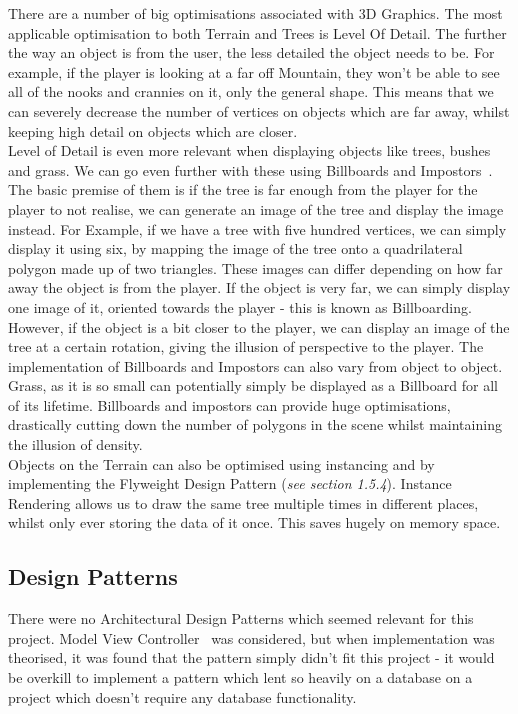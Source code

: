 \documentclass[a4paper,10pt]{report}
\begin{document}
There are a number of big optimisations associated with 3D Graphics. The most applicable optimisation to both Terrain and Trees is Level Of Detail. The further the way an object is from the user, the less detailed the object needs to be. For example, if the player is looking at a far off Mountain, they won't be able to see all of the nooks and crannies on it, only the general shape. This means that we can severely decrease the number of vertices on objects which are far away, whilst keeping high detail on objects which are closer. \\

Level of Detail is even more relevant when displaying objects like trees, bushes and grass. We can go even further with these using Billboards and Impostors~\cite{jia2013fast}. The basic premise of them is if the tree is far enough from the player for the player to not realise, we can generate an image of the tree and display the image instead. For Example, if we have a tree with five hundred vertices, we can simply display it using six, by mapping the image of the tree onto a quadrilateral polygon made up of two triangles. These images can differ depending on how far away the object is from the player. If the object is very far, we can simply display one image of it, oriented towards the player - this is known as Billboarding. However, if the object is a bit closer to the player, we can display an image of the tree at a certain rotation, giving the illusion of perspective to the player. The implementation of Billboards and Impostors can also vary from object to object. Grass, as it is so small can potentially simply be displayed as a Billboard for all of its lifetime. Billboards and impostors can provide huge optimisations, drastically cutting down the number of polygons in the scene whilst maintaining the illusion of density. \\

Objects on the Terrain can also be optimised using instancing and by implementing the Flyweight Design Pattern (\emph{see section 1.5.4}). Instance Rendering allows us to draw the same tree multiple times in different places, whilst only ever storing the data of it once. This saves hugely on memory space.  


\subsection{Design Patterns}

There were no Architectural Design Patterns which seemed relevant for this project. Model View Controller~\cite{vlissides1995design} was considered, but when implementation was theorised, it was found that the pattern simply didn't fit this project - it would be overkill to implement a pattern which lent so heavily on a database on a project which doesn't require any database functionality. \\
\end{document}
